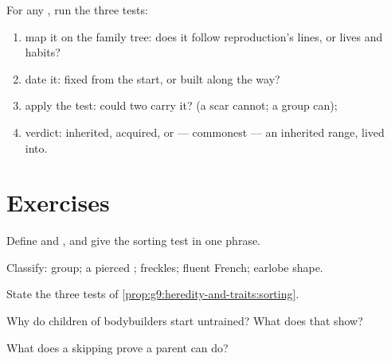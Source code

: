 \begin{method}\label{met:g9:heredity-and-traits:audit}
For any , run the three tests:
\begin{enumerate}
  \item map it on the family tree: does it follow
        reproduction's lines, or lives and habits?
  \item date it: fixed from the start, or built along the
        way?
  \item apply the  test: could two  carry it?
        (a scar cannot; a  group can);
  \item verdict: inherited, acquired, or --- commonest
        --- an inherited range, lived into.
\end{enumerate}
\end{method}

\section{Exercises}

\begin{exercise}[$\star$]\label{exo:g9:heredity-and-traits:1}
Define  and , and give the sorting test in
one phrase.
\end{exercise}

\begin{exercise}[$\star$]\label{exo:g9:heredity-and-traits:2}
Classify:  group; a pierced ; freckles; fluent
French; earlobe shape.
\end{exercise}

\begin{exercise}[$\star$]\label{exo:g9:heredity-and-traits:3}
State the three tests of
\cref{prop:g9:heredity-and-traits:sorting}.
\end{exercise}

\begin{exercise}[$\star$]\label{exo:g9:heredity-and-traits:4}
Why do children of bodybuilders start untrained? What
does that show?
\end{exercise}

\begin{exercise}[$\star$]\label{exo:g9:heredity-and-traits:5}
What does a skipping  prove a parent can do?
\end{exercise}

